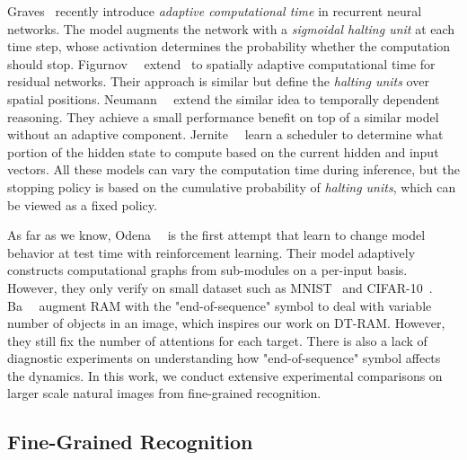 \documentclass[10pt,twocolumn,letterpaper]{article}
\begin{document}
Graves~\cite{graves2016adaptive} recently introduce {\em adaptive computational time} in recurrent neural networks.
The model augments the network with a {\em sigmoidal halting unit} at each time step, whose activation determines the probability whether the computation should stop.
Figurnov~\etal~\cite{figurnov2016spatially} extend~\cite{graves2016adaptive} to spatially adaptive computational time for residual networks.
Their approach is similar but define the {\em halting units} over spatial positions.
Neumann~\etal~\cite{neumann2016learning} extend the similar idea to temporally dependent reasoning.
They achieve a small performance benefit on top of a similar model without an adaptive component.
Jernite~\etal~\cite{jernite2016variable} learn a scheduler to determine what portion of the hidden state to compute based on the current hidden and input vectors.
All these models can vary the computation time during inference, but the stopping policy is based on the cumulative probability of {\em halting units}, which can be viewed as a fixed policy.

As far as we know, Odena~\etal~\cite{odena2017changing} is the first attempt that learn to change model behavior at test time with reinforcement learning.
Their model adaptively constructs computational graphs from sub-modules on a per-input basis.
However, they only verify on small dataset such as MNIST~\cite{lecun1998gradient} and CIFAR-10~\cite{krizhevsky2009learning}.
Ba~\etal~\cite{ba2014multiple} augment RAM with the "end-of-sequence" symbol to deal with variable number of objects in an image, which inspires our work on DT-RAM.
However, they still fix the number of attentions for each target.
There is also a lack of diagnostic experiments on understanding how "end-of-sequence" symbol affects the dynamics.
In this work, we conduct extensive experimental comparisons on larger scale natural images from fine-grained recognition.

\subsection{Fine-Grained Recognition}
\end{document}
